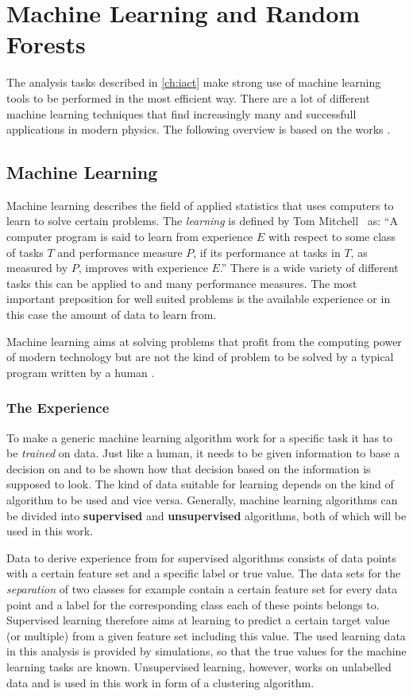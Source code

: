 \chapter{Machine Learning and Random Forests}
\label{ch:ML}
%
The analysis tasks described in \autoref{ch:iact} make strong use of machine
learning tools to be performed in the most efficient way. There are a lot of
different machine learning techniques that find increasingly many and
successfull applications in modern physics. The following overview is based on
the works \cite{bagging, goodfellow, mitchell}.

\section{Machine Learning}
%
Machine learning describes the field of applied statistics that uses computers
to learn to solve certain problems. The \textit{learning} is defined by Tom
Mitchell~\cite{mitchell} as: \enquote{A computer program is said to learn from
experience $E$ with respect to some class of tasks $T$ and performance measure
$P$, if its performance at tasks in $T$, as measured by $P$, improves with
experience $E$.} There is a wide variety of different tasks this can be applied
to and many performance measures. The most important preposition for well
suited problems is the available experience or in this case the amount of data
to learn from.

Machine learning aims at solving problems that profit from the computing power
of modern technology but are not the kind of problem to be solved by a typical
program written by a human \cite{goodfellow}.

\subsection{The Experience}
%
To make a generic machine learning algorithm work for a specific task it has to
be \textit{trained} on data. Just like a human, it needs to be given
information to base a decision on and to be shown how that decision based on
the information is supposed to look. The kind of data suitable for learning
depends on the kind of algorithm to be used and vice versa. Generally, machine
learning algorithms can be divided into \textbf{supervised} and
\textbf{unsupervised} algorithms, both of which will be used in this work.

Data to derive experience from for supervised algorithms consists of data points
with a certain feature set and a specific label or true value. The data sets for
the \textit{separation} of two classes for example contain a certain feature
set for every data point and a label for the corresponding class each of these
points belongs to. Supervised learning therefore aims at learning to predict
a certain target value (or multiple) from a given feature set including this
value. The used learning data in this analysis is provided by simulations, so
that the true values for the machine learning tasks are known. Unsupervised
learning, however, works on unlabelled data and is used in this work in form of
a clustering algorithm.

